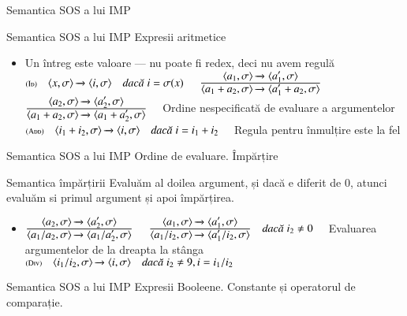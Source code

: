 \documentclass[xcolor=pdftex,romanian,colorlinks]{beamer}
\begin{document}
\begin{section}{Semantica SOS a lui IMP}
\begin{comment}
  $$\sigma[v/x] (y) = \left\{\begin{array}{r@{\mbox{, dacă }}l}
  \sigma	(y) & y \neq x \\
  v & y = x
  \end{array}
  \right.$$
  \end{itemize}
  \end{block}
  \end{frame}
  \end{subsection}
\end{comment}
  \begin{frame}{Semantica SOS a lui IMP}
  {Expresii aritmetice}
  \begin{itemize}
  \item Un întreg este valoare --- nu poate fi redex, deci nu avem regulă
  \vitem[] $\reg[Id]{\Ss{\c{x,\sigma}}{\c{i, \sigma}}}{}{i = \sigma(x)}$
  \vitem[] $\reg{\Ss{\c{a_1 + a_2,\sigma}}{\c{a_1' + a_2,\sigma}}}{\Ss{\c{a_1,\sigma}}{\c{a_1',\sigma}}}{}$\hfill$\reg{\Ss{\c{a_1 + a_2,\sigma}}{\c{a_1 + a_2',\sigma}}}{\Ss{\c{a_2,\sigma}}{\c{a_2',\sigma}}}{}$
  \vitem Ordine nespecificată de evaluare a argumentelor
  \vitem[] $\reg[Add]{\Ss{\c{i_1 + i_2,\sigma}}{\c{i,\sigma}}}{}{i = i_1 + i_2}$
  \vitem Regula pentru înmulțire este la fel
  \end{itemize}
  \end{frame}
  \begin{frame}{Semantica SOS a lui IMP}
  {Ordine de evaluare. Împărțire}
  \begin{block}{Semantica împărțirii}
  Evaluăm al doilea argument, și dacă e diferit de 0, atunci evaluăm si primul argument și apoi împărțirea.
  \end{block}
  \begin{itemize}
  \item[] $\reg{\Ss{\c{a_1 / a_2,\sigma}}{\c{a_1 / a_2',\sigma}}}{\Ss{\c{a_2,\sigma}}{\c{a_2',\sigma}}}{}$
  \vitem[] $\reg{\Ss{\c{a_1 / i_2,\sigma}}{\c{a_1' / i_2,\sigma}}}{\Ss{\c{a_1,\sigma}}{\c{a_1',\sigma}}}{i_2 \neq 0}$
  \vitem Evaluarea argumentelor de la dreapta la stânga
  \vitem[] $\reg[Div]{\Ss{\c{i_1 / i_2,\sigma}}{\c{i,\sigma}}}{}{i_2\neq 9, i = i_1 / i_2}$
  \end{itemize}
  \end{frame}
  \begin{frame}{Semantica SOS a lui IMP}
  {Expresii Booleene. Constante și operatorul de comparație.}
  \begin{itemize}

\end{itemize}
\end{frame}
\end{section}
\end{document}
